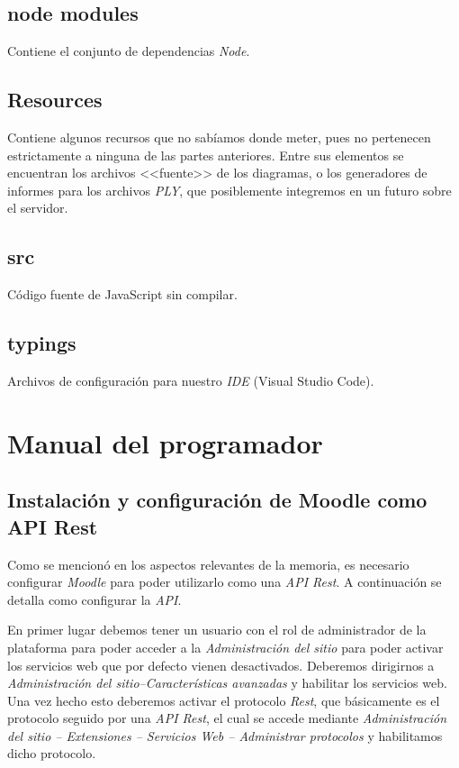 \subsection{node modules}
Contiene el conjunto de dependencias \textit{Node}.

\subsection{Resources}
Contiene algunos recursos que no sabíamos donde meter, pues no pertenecen estrictamente a ninguna de las partes anteriores. Entre sus elementos se encuentran los archivos <<fuente>> de los diagramas, o los generadores de informes para los archivos \textit{PLY}, que posiblemente integremos en un futuro sobre el servidor.

\subsection{src}
Código fuente de JavaScript sin compilar.

\subsection{typings}
Archivos de configuración para nuestro \textit{IDE} (Visual Studio Code).

\section{Manual del programador}\label{sec:manual-programador}

\subsection{Instalación y configuración de Moodle como API Rest}
Como se mencionó en los aspectos relevantes de la memoria, es necesario configurar \textit{Moodle} para poder utilizarlo como una \textit{API Rest}. A continuación se detalla como configurar la \textit{API}.

En primer lugar debemos tener un usuario con el rol de administrador de la plataforma para poder acceder a la \textit{Administración del sitio} para poder activar los servicios web que por defecto vienen desactivados. Deberemos dirigirnos a \textit{Administración del sitio--Características avanzadas} y habilitar los servicios web. Una vez hecho esto deberemos activar el protocolo \textit{Rest}, que básicamente es el protocolo seguido por una \textit{API Rest}, el cual se accede mediante \textit{Administración del sitio -- Extensiones -- Servicios Web -- Administrar protocolos} y habilitamos dicho protocolo.

